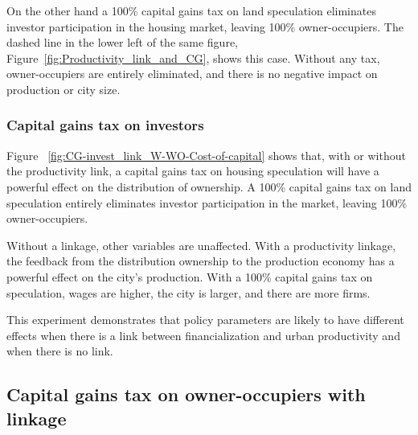 On the other hand a 100\% capital gains tax on land speculation eliminates investor participation in the housing market, leaving  100\%  owner-occupiers. The dashed line in the lower left of the same figure,  Figure~\ref{fig:Productivity_link_and_CG},  shows this case. Without any tax, owner-occupiers are entirely eliminated, and there is no negative impact on production or city size.  

\subsubsection{Capital gains tax on investors}



Figure ~\ref{fig:CG-invest_link_W-WO-Cost-of-capital} shows that, with or without the productivity link, a capital gains tax on housing speculation will have a powerful effect on the distribution of ownership. A 100\% capital gains tax on land speculation entirely eliminates investor participation in the market, leaving 100\%  owner-occupiers. 

Without a linkage, other variables are unaffected. With a productivity linkage, the feedback from the distribution ownership to the production economy has a powerful effect on the city's production. With a 100\% capital gains tax on speculation, wages are  higher, the city is larger, and there are more firms. 

 This experiment demonstrates that policy parameters are likely to have different effects when there is a link between financialization and urban productivity and when there is no link.


\subsection{Capital gains tax on owner-occupiers  with linkage}

